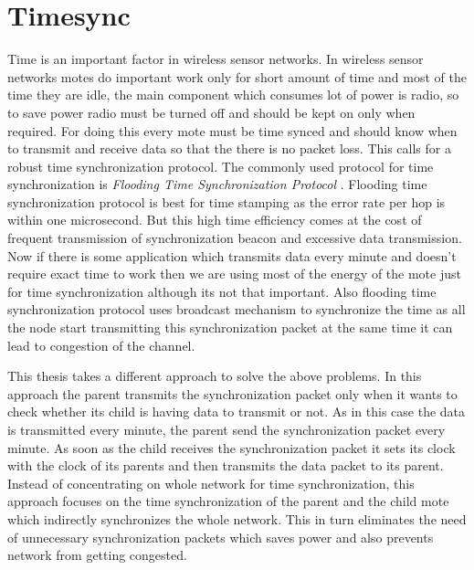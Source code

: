 \chapter*{Timesync}
Time is an important factor in wireless sensor networks. In wireless sensor networks motes do important work only for short amount of time and most of the time they are idle, the main component which consumes lot of power is radio, so to save power radio must be turned off and should be kept on only when required. For doing this every mote must be time synced and should know when to transmit and receive data so that the there is no packet loss. This calls for a robust time synchronization protocol. The  commonly used protocol for time synchronization is \textit{Flooding Time Synchronization Protocol} \cite{Maroti:2004:FTS:1031495.1031501}. Flooding time synchronization protocol is best for time stamping as the error rate per hop is within one microsecond. But this high time efficiency comes at the cost of frequent transmission of synchronization beacon and excessive data transmission. Now if there is some application which transmits data every minute and doesn't require exact time to work then we are using most of the energy of the mote just for time synchronization although its not that important. Also flooding time synchronization protocol uses broadcast mechanism to synchronize the time as all the node start transmitting this synchronization packet at the same time it can lead to congestion of the channel.

This thesis takes a different approach to solve the above problems. In this approach the parent transmits the synchronization packet only when it wants to check whether its child is having data to transmit or not. As in this case the data is transmitted every minute, the parent send the synchronization packet every minute. As soon as the child receives the synchronization packet it sets its clock with the clock of its parents and then transmits the data packet to its parent. Instead of concentrating on whole network for time synchronization, this approach focuses on the time synchronization of the parent and the child mote which indirectly synchronizes the whole network. This in turn eliminates the need of unnecessary synchronization packets which saves power and also prevents network from getting congested.

